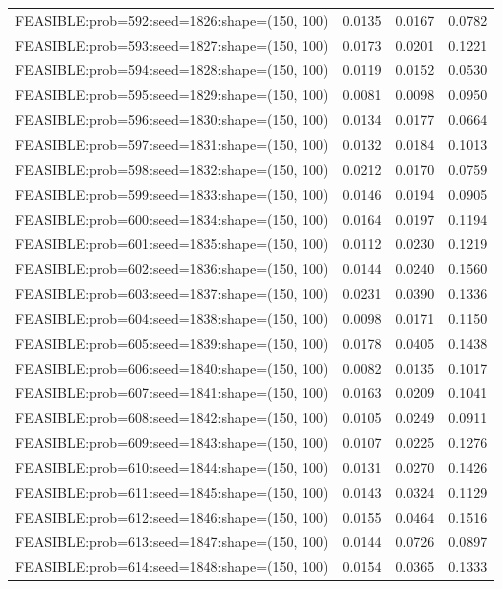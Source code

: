 \begin{longtable}{lccc}
FEASIBLE:prob=592:seed=1826:shape=(150, 100) & 0.0135 & 0.0167 & 0.0782 \\
FEASIBLE:prob=593:seed=1827:shape=(150, 100) & 0.0173 & 0.0201 & 0.1221 \\
FEASIBLE:prob=594:seed=1828:shape=(150, 100) & 0.0119 & 0.0152 & 0.0530 \\
FEASIBLE:prob=595:seed=1829:shape=(150, 100) & 0.0081 & 0.0098 & 0.0950 \\
FEASIBLE:prob=596:seed=1830:shape=(150, 100) & 0.0134 & 0.0177 & 0.0664 \\
FEASIBLE:prob=597:seed=1831:shape=(150, 100) & 0.0132 & 0.0184 & 0.1013 \\
FEASIBLE:prob=598:seed=1832:shape=(150, 100) & 0.0212 & 0.0170 & 0.0759 \\
FEASIBLE:prob=599:seed=1833:shape=(150, 100) & 0.0146 & 0.0194 & 0.0905 \\
FEASIBLE:prob=600:seed=1834:shape=(150, 100) & 0.0164 & 0.0197 & 0.1194 \\
FEASIBLE:prob=601:seed=1835:shape=(150, 100) & 0.0112 & 0.0230 & 0.1219 \\
FEASIBLE:prob=602:seed=1836:shape=(150, 100) & 0.0144 & 0.0240 & 0.1560 \\
FEASIBLE:prob=603:seed=1837:shape=(150, 100) & 0.0231 & 0.0390 & 0.1336 \\
FEASIBLE:prob=604:seed=1838:shape=(150, 100) & 0.0098 & 0.0171 & 0.1150 \\
FEASIBLE:prob=605:seed=1839:shape=(150, 100) & 0.0178 & 0.0405 & 0.1438 \\
FEASIBLE:prob=606:seed=1840:shape=(150, 100) & 0.0082 & 0.0135 & 0.1017 \\
FEASIBLE:prob=607:seed=1841:shape=(150, 100) & 0.0163 & 0.0209 & 0.1041 \\
FEASIBLE:prob=608:seed=1842:shape=(150, 100) & 0.0105 & 0.0249 & 0.0911 \\
FEASIBLE:prob=609:seed=1843:shape=(150, 100) & 0.0107 & 0.0225 & 0.1276 \\
FEASIBLE:prob=610:seed=1844:shape=(150, 100) & 0.0131 & 0.0270 & 0.1426 \\
FEASIBLE:prob=611:seed=1845:shape=(150, 100) & 0.0143 & 0.0324 & 0.1129 \\
FEASIBLE:prob=612:seed=1846:shape=(150, 100) & 0.0155 & 0.0464 & 0.1516 \\
FEASIBLE:prob=613:seed=1847:shape=(150, 100) & 0.0144 & 0.0726 & 0.0897 \\
FEASIBLE:prob=614:seed=1848:shape=(150, 100) & 0.0154 & 0.0365 & 0.1333 \\

\end{longtable}
